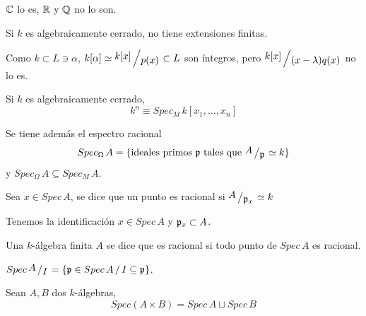     \begin{ejem}
        $\mathbb{C}$ lo es, $\mathbb{R}$ y $\mathbb{Q}$ no lo son.
    \end{ejem}
\begin{prop}
    Si $k$ es algebraicamente cerrado, no tiene extensiones finitas.
\end{prop}
\begin{dem}
    Como $k \subset L \ni \alpha$, $k[\alpha] \simeq \modulo{k[x]}{p(x)} \subset L$ son \'integros, pero $\modulo{k[x]}{(x-\lambda)q(x)}$ no lo es.
\end{dem}
\begin{cor}
    Si $k$ es algebraicamente cerrado, 
    $$k^n \equiv Spec_M \,  k[x_1, \ldots, x_n]$$
\end{cor}\begin{defi}
    Se tiene adem\'as el espectro racional
    $$Spec_{\Omega} \, A = \{\text{ideales primos } \p \text{ tales que } \modulo{A}{\p} \simeq k\}$$
    y $Spec_{\Omega}\, A \subseteq Spec_{M} \, A$.
\end{defi}
\begin{defi}
    Sea $x\in Spec\, A$, se dice que un punto es racional si $\modulo{A}{\p_x} \simeq k$
\end{defi}
\begin{obs}
    Tenemos la identificaci\'on $x\in Spec\, A$ y $\mathfrak{p}_x \subset A$. 
\end{obs}
\begin{defi}
    Una $k$-\'algebra finita $A$ se dice que es racional si todo punto de $Spec\, A$ es racional. 
\end{defi}
\begin{prop}
    $Spec\, \modulo{A}{I} = \{\p \in Spec \, A \, / \, I\subseteq \p \}$.
\end{prop}
\begin{prop}
    Sean $A,B$ dos $k$-\'algebras, 
    $$Spec(A \times B) = Spec \, A \sqcup Spec\, B$$
\end{prop}
